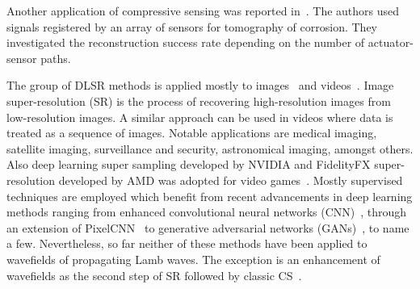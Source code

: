 Another application of compressive sensing was reported in~\cite{Chang2020}. 
The authors used signals registered by an array of sensors for tomography of corrosion.
They investigated the reconstruction success rate depending on the number of actuator-sensor paths.

The group of DLSR methods is applied mostly to images~\cite{Dahl2017,Zhang2018,Wang2019} and videos~\cite{Zhang2017,Yan2019}.
Image super-resolution (SR) is the process of recovering high-resolution images from low-resolution images.
A similar approach can be used in videos where data is treated as a sequence of images.
Notable applications are medical imaging, satellite imaging, surveillance and security, astronomical imaging, amongst others.
Also deep learning super sampling developed by NVIDIA and FidelityFX super-resolution developed by AMD was adopted for video games~\cite{Claypool2006}.
Mostly supervised techniques are employed
which benefit from recent advancements in deep learning methods ranging from enhanced convolutional neural networks (CNN)~\cite{Zhang2017}, through an extension of PixelCNN~\cite{Dahl2017} to generative adversarial networks (GANs)~\cite{Wang2019}, to name a few.
Nevertheless, so far neither of these methods have been applied to wavefields of propagating Lamb waves.
The exception is an enhancement of wavefields as the second step of SR followed by classic CS~\cite{Park2017a,KeshmiriEsfandabadi2020}.